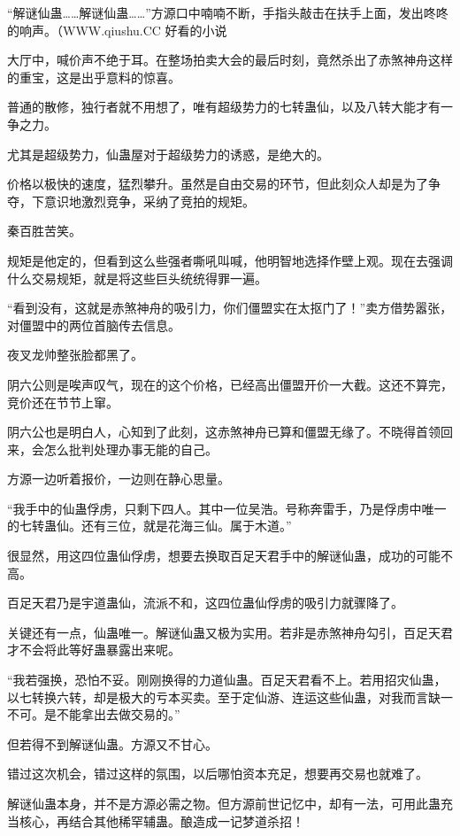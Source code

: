 
\begin{this_body}

“解谜仙蛊……解谜仙蛊……”方源口中喃喃不断，手指头敲击在扶手上面，发出咚咚的响声。（WWW.qiushu.CC 好看的小说

大厅中，喊价声不绝于耳。在整场拍卖大会的最后时刻，竟然杀出了赤煞神舟这样的重宝，这是出乎意料的惊喜。

普通的散修，独行者就不用想了，唯有超级势力的七转蛊仙，以及八转大能才有一争之力。

尤其是超级势力，仙蛊屋对于超级势力的诱惑，是绝大的。

价格以极快的速度，猛烈攀升。虽然是自由交易的环节，但此刻众人却是为了争夺，下意识地激烈竞争，采纳了竞拍的规矩。

秦百胜苦笑。

规矩是他定的，但看到这么些强者嘶吼叫喊，他明智地选择作壁上观。现在去强调什么交易规矩，就是将这些巨头统统得罪一遍。

“看到没有，这就是赤煞神舟的吸引力，你们僵盟实在太抠门了！”卖方借势嚣张，对僵盟中的两位首脑传去信息。

夜叉龙帅整张脸都黑了。

阴六公则是唉声叹气，现在的这个价格，已经高出僵盟开价一大截。这还不算完，竞价还在节节上窜。

阴六公也是明白人，心知到了此刻，这赤煞神舟已算和僵盟无缘了。不晓得首领回来，会怎么批判处理办事无能的自己。

方源一边听着报价，一边则在静心思量。

“我手中的仙蛊俘虏，只剩下四人。其中一位吴浩。号称奔雷手，乃是俘虏中唯一的七转蛊仙。还有三位，就是花海三仙。属于木道。”

很显然，用这四位蛊仙俘虏，想要去换取百足天君手中的解谜仙蛊，成功的可能不高。

百足天君乃是宇道蛊仙，流派不和，这四位蛊仙俘虏的吸引力就骤降了。

关键还有一点，仙蛊唯一。解谜仙蛊又极为实用。若非是赤煞神舟勾引，百足天君才不会将此等好蛊暴露出来呢。

“我若强换，恐怕不妥。刚刚换得的力道仙蛊。百足天君看不上。若用招灾仙蛊，以七转换六转，却是极大的亏本买卖。至于定仙游、连运这些仙蛊，对我而言缺一不可。是不能拿出去做交易的。”

但若得不到解谜仙蛊。方源又不甘心。

错过这次机会，错过这样的氛围，以后哪怕资本充足，想要再交易也就难了。

解谜仙蛊本身，并不是方源必需之物。但方源前世记忆中，却有一法，可用此蛊充当核心，再结合其他稀罕辅蛊。酿造成一记梦道杀招！


\end{this_body}
